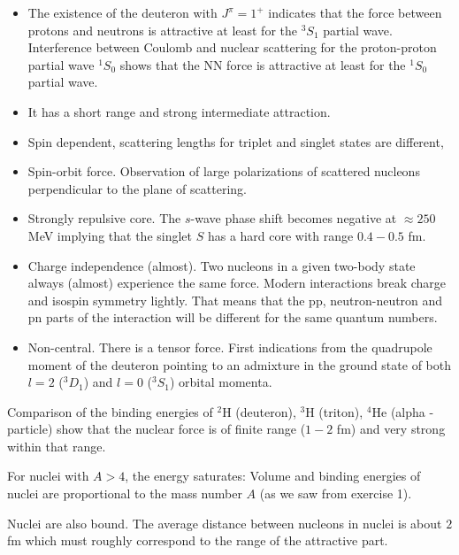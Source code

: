 \documentclass[graybox,sectrefs,envcountresetchap,open=right]{svmonodo}
\begin{document}
\begin{itemize}
\item The existence of the deuteron with $J^{\pi}=1^+$ indicates that the force between protons and neutrons is attractive at least for the $^3S_1$ partial wave. Interference between Coulomb and nuclear scattering for the proton-proton partial wave $^1S_0$ shows that  the NN force is attractive at least for the $^1S_0$ partial wave. 

\item It has a short range and strong intermediate attraction.

\item Spin dependent, scattering lengths for triplet and singlet states are different,

\item Spin-orbit force. Observation of large polarizations of scattered nucleons perpendicular to the plane of scattering.

\item Strongly repulsive core. The $s$-wave phase shift becomes negative at $\approx 250$ MeV implying that the singlet $S$ has a hard core with range $0.4-0.5$ fm. 

\item Charge independence (almost). Two nucleons in a given two-body state always (almost) experience the same force. Modern interactions break charge and isospin symmetry lightly. That means that the pp, neutron-neutron and pn parts of the interaction will be different for the same quantum numbers. 

\item Non-central. There is a tensor force. First indications from the quadrupole moment of the deuteron pointing to an admixture in the ground state of both $l=2$ ($^3D_1$) and $l=0$ ($^3S_1$) orbital momenta.
\end{itemize}

\noindent
Comparison of the binding energies of
${}^2\mbox{H}$ (deuteron), ${}^3\mbox{H}$ (triton), ${}^4\mbox{He}$ (alpha - particle) show that the nuclear force is of finite range ($1-2$ fm) and very strong within that range.

For nuclei with $A>4$, the energy saturates: Volume and binding energies of nuclei are proportional to the mass number $A$ (as we saw from exercise 1).

Nuclei are also bound. The average distance
between nucleons in nuclei is about $2$ fm which
must roughly correspond to the range of the
attractive part.
\end{document}
